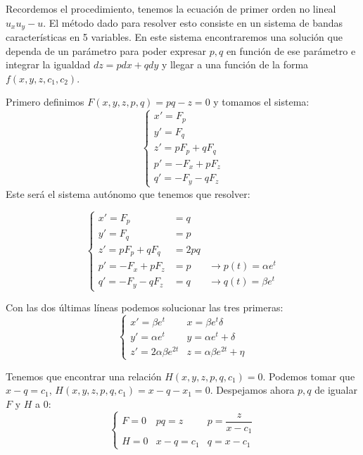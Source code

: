 \documentclass[openany]{book}
\begin{document}
\begin{exercise}
  Recordemos el procedimiento, tenemos la ecuación de primer orden no lineal $ u_{x}u_{y}-u $. El método dado para resolver esto consiste en un sistema de bandas características en 5 variables. En este sistema encontraremos una solución que dependa de un parámetro para poder expresar $ p,q $ en función de ese parámetro e integrar la igualdad $ dz = pdx+qdy $ y llegar a una función de la forma $ f(x,y,z,c_1,c_2) $.

  Primero definimos $ F(x,y,z,p,q) = pq-z = 0 $ y tomamos el sistema:
  $$ \left\{
  \begin{array}{l}
    x' = F_{p} \\ 
    y' = F_{q} \\ 
    z ' = pF_{p} +qF_{q} \\ 
    p' = -F_{x}+pF_{z}\\ 
    q' = -F_{y}-qF_{z} 
  \end{array}
  \right. $$
  Este será el sistema autónomo que tenemos que resolver:

  $$ \left\{
    \begin{array}{lll}
      x' = F_{p} &  = q\\ 
      y' = F_{q} & = p\\ 
      z ' = pF_{p} +qF_{q} & = 2pq \\ 
      p' = -F_{x}+pF_{z} & = p & \to p(t) = \alpha e^{t}\\ 
      q' = -F_{y}-qF_{z} & = q  & \to q(t) = \beta e^{t}
    \end{array}
    \right. $$

    Con las dos últimas líneas podemos solucionar las tres primeras:
    $$ \left\{
    \begin{array}{ll}
      x' = \beta e^{t} & x = \beta e^{t}\delta\\ 
      y' = \alpha e^{t} & y = \alpha e^{t}+\delta\\ 
      z' = 2 \alpha \beta e^{2t} & z = \alpha \beta e^{2t} + \eta 
    \end{array}
    \right. $$

    Tenemos que encontrar una relación $ H(x,y,z,p,q,c_1) = 0 $. Podemos tomar que $ x-q = c_1 $, $ H(x,y,z,p,q,c_1) = x-q-x_1 = 0 $. Despejamos ahora $ p,q $ de igualar $ F $ y $ H $ a 0:
    $$ \left\{
    \begin{array}{lll}
      F = 0 & pq = z & p = \dfrac{z}{x-c_1}\\ 
      H = 0 & x-q = c_1 & q = x-c_1
    \end{array}
    \right.  $$


\end{exercise}
\end{document}
